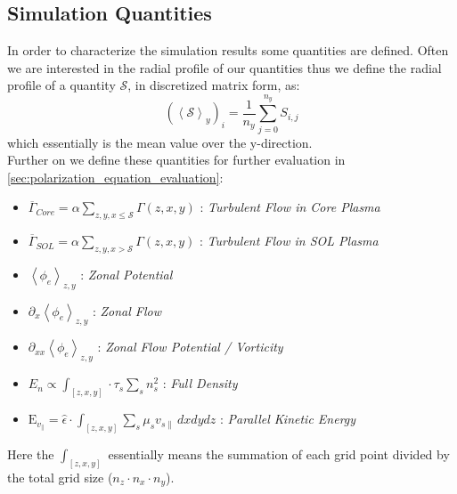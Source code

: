 \documentclass[master.tex]{subfiles}
\newcommand{\meanxy}[1]{\left<#1\right>_{z,y}}
\begin{document}
\subsection{Simulation Quantities}\label{sec:simulation_quantities}

In order to characterize the simulation results some quantities are defined. Often we are interested in the radial profile of our quantities thus we define the radial profile of a quantity $\mathcal{S}$, in discretized matrix form, as:
\begin{equation}
    (\left<\mathcal{S}\right>_y)_i = \frac{1}{n_y} \sum_{j=0}^{n_y} S_{i, j}
\end{equation}
which essentially is the mean value over the y-direction.\\
Further on we define these quantities for further evaluation in \autoref{sec:polarization_equation_evaluation}:

\begin{itemize}
    \item $\overline{\Gamma}_{Core} = \alpha \sum_{z, y, x \leq \mathcal{S}} \Gamma(z,x,y)$ : \textit{Turbulent Flow in Core Plasma}
    \item $\overline{\Gamma}_{SOL} = \alpha \sum_{z, y, x > \mathcal{S}} \Gamma(z,x,y)$ : \textit{Turbulent Flow in \ac{SOL} Plasma}
    \item $\meanxy{\phi_e}$ : \textit{Zonal Potential}
    \item $\partial_x \meanxy{\phi_e}$ : \textit{Zonal Flow}
    \item $\partial_{xx}\meanxy{\phi_e}$ : \textit{Zonal Flow Potential / Vorticity}
    \item $E_n \propto \int_{[z,x,y]} \cdot \tau_s \sum_s n_s^2$ : \textit{Full Density}
    \item $\mathrm{E}_{v_\parallel} = \hat{\epsilon} \cdot \int_{[z,x,y]} \sum_s \mu_s v_{s\parallel} \, dxdydz$ : \textit{Parallel Kinetic Energy}
\end{itemize}

Here the $\int_{[z,x,y]}$ essentially means the summation of each grid point divided by the total grid size ($n_z \cdot n_x \cdot n_y$).
\end{document}
